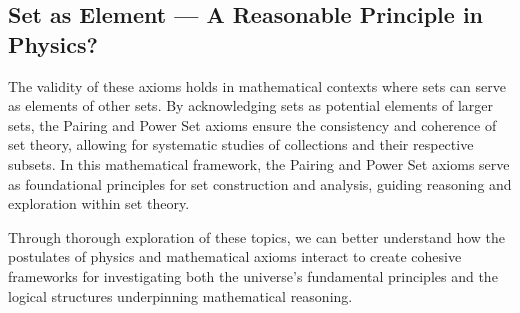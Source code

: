 \documentclass{article}
\begin{document}
\subsection{Set as Element — A Reasonable Principle in Physics?}

The validity of these axioms holds in mathematical contexts where sets can serve as elements of other sets. By acknowledging sets as potential elements of larger sets, the Pairing and Power Set axioms ensure the consistency and coherence of set theory, allowing for systematic studies of collections and their respective subsets. In this mathematical framework, the Pairing and Power Set axioms serve as foundational principles for set construction and analysis, guiding reasoning and exploration within set theory.

Through thorough exploration of these topics, we can better understand how the postulates of physics and mathematical axioms interact to create cohesive frameworks for investigating both the universe's fundamental principles and the logical structures underpinning mathematical reasoning.
\end{document}
